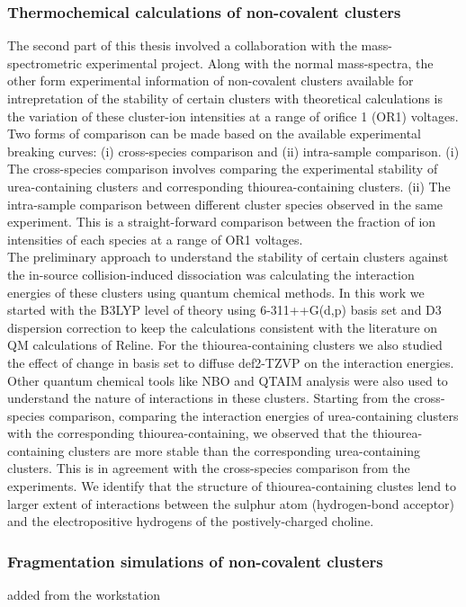 \subsubsection*{Thermochemical calculations of non-covalent clusters}
The second part of this thesis involved a collaboration with the mass-spectrometric experimental project.
Along with the normal mass-spectra, the other form experimental information of non-covalent clusters available for intrepretation of the stability of certain clusters with theoretical calculations is the variation of these cluster-ion intensities at a range of orifice 1 (OR1) voltages.
 \\ Two forms of comparison can be made based on the available experimental breaking curves: (i) cross-species comparison and (ii) intra-sample comparison. (i) The cross-species comparison involves comparing the experimental stability of urea-containing clusters and corresponding thiourea-containing clusters. (ii) The intra-sample comparison between different cluster species observed in the same experiment. This is a straight-forward comparison between the fraction of ion intensities of each species at a range of OR1 voltages.
\\
 The preliminary approach to understand the stability of certain clusters against the in-source collision-induced dissociation was calculating the interaction energies of these clusters using quantum chemical methods. In this work we started with the B3LYP level of theory using 6-311++G(d,p) basis set and D3 dispersion correction to keep the calculations consistent with the literature on QM calculations of Reline.
For the thiourea-containing clusters we also studied the effect of change in basis set to diffuse def2-TZVP on the interaction energies. Other quantum chemical tools like NBO and QTAIM analysis were also used to understand the nature of interactions in these clusters.
Starting from the cross-species comparison, comparing the interaction energies of urea-containing clusters with the corresponding thiourea-containing, we observed that the thiourea-containing clusters are more stable than the corresponding urea-containing clusters. This is in agreement with the cross-species comparison from the experiments. We identify that the structure of thiourea-containing clustes lend to larger extent of interactions between the sulphur atom (hydrogen-bond acceptor) and the electropositive hydrogens of the postively-charged choline.
\subsubsection*{Fragmentation simulations of non-covalent clusters}
added from the workstation